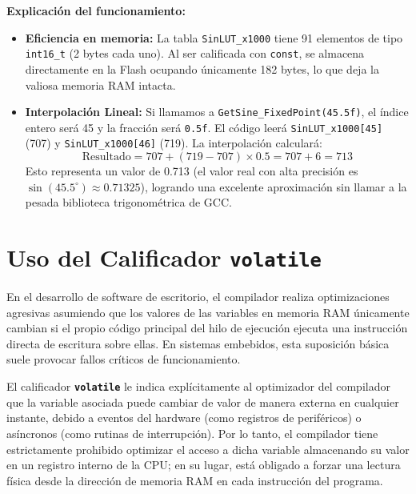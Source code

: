 \documentclass[
10pt, %
a4paper, %
oneside, %
headinclude,footinclude, %
BCOR5mm, %
]{scrartcl}
\begin{document}
\begin{enumerate}
\begin{itemize}
		\newpage
		\textbf{Explicación del funcionamiento:}
		\begin{itemize}
			\item \textbf{Eficiencia en memoria:} La tabla \texttt{SinLUT\_x1000} tiene 91 elementos de tipo \texttt{int16\_t} (2 bytes cada uno). Al ser calificada con \texttt{const}, se almacena directamente en la Flash ocupando únicamente 182 bytes, lo que deja la valiosa memoria RAM intacta.
			\item \textbf{Interpolación Lineal:} Si llamamos a \texttt{GetSine\_FixedPoint(45.5f)}, el índice entero será 45 y la fracción será \texttt{0.5f}. El código leerá \texttt{SinLUT\_x1000[45]} (707) y \texttt{SinLUT\_x1000[46]} (719). La interpolación calculará:
			$$\text{Resultado} = 707 + (719 - 707) \times 0.5 = 707 + 6 = 713$$
			Esto representa un valor de 0.713 (el valor real con alta precisión es $\sin(45.5^\circ) \approx 0.71325$), logrando una excelente aproximación sin llamar a la pesada biblioteca trigonométrica de GCC.
		\end{itemize}
	\end{itemize}
\end{enumerate}

\newpage
\section{Uso del Calificador \texttt{volatile}}

En el desarrollo de software de escritorio, el compilador realiza optimizaciones agresivas asumiendo que los valores de las variables en memoria RAM únicamente cambian si el propio código principal del hilo de ejecución ejecuta una instrucción directa de escritura sobre ellas. En sistemas embebidos, esta suposición básica suele provocar fallos críticos de funcionamiento.

El calificador \textbf{\texttt{volatile}} le indica explícitamente al optimizador del compilador que la variable asociada puede cambiar de valor de manera externa en cualquier instante, debido a eventos del hardware (como registros de periféricos) o asíncronos (como rutinas de interrupción). Por lo tanto, el compilador tiene estrictamente prohibido optimizar el acceso a dicha variable almacenando su valor en un registro interno de la CPU; en su lugar, está obligado a forzar una lectura física desde la dirección de memoria RAM en cada instrucción del programa.
\end{document}
